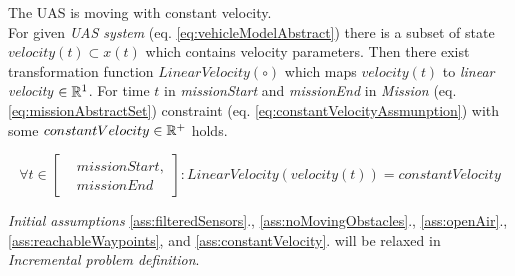     \begin{assumption}
        {The UAS is moving with constant velocity}\label{ass:constantVelocity}.\\
        For given \emph{UAS system} (eq. \ref{eq:vehicleModelAbstract}) there is a subset of state $velocity(t)\subset x(t)$ which contains velocity parameters. Then there exist transformation function $LinearVelocity(\circ)$ which maps $velocity(t)$  to \emph{linear velocity} $\in\mathbb{R}^1$. For time $t$ in \emph{missionStart} and \emph{missionEnd} in \emph{Mission} (eq. \ref{eq:missionAbstractSet}) constraint (eq. \ref{eq:constantVelocityAssmunption}) with some $constantVelocity \in \mathbb{R}^+$ holds.

        \begin{equation}\label{eq:constantVelocityAssmunption}
            \forall t \in \left[\begin{aligned}&missionStart,\\&missionEnd\end{aligned}\right]: LinearVelocity(velocity(t))=constantVelocity
        \end{equation}    
    \end{assumption}

    \begin{note}
        \emph{Initial assumptions} \ref{ass:filteredSensors}., \ref{ass:noMovingObstacles}., \ref{ass:openAir}., \ref{ass:reachableWaypoints}, and \ref{ass:constantVelocity}. will be relaxed in \emph{Incremental problem definition}.
    \end{note}